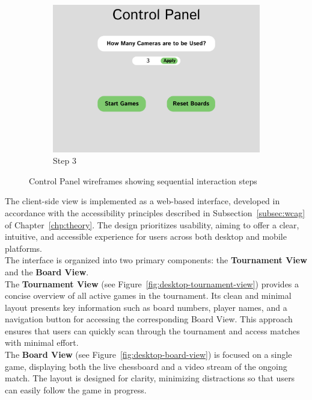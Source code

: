 \begin{figure}[h!]
    \begin{subfigure}[h!]{0.40\linewidth}
        \centering
        \includegraphics[width=\linewidth]{figures/methods/wireframes/control-panel-3.png}
        \caption{Step 3}
        \label{fig:control-panel-3}
    \end{subfigure}
    
    \caption{Control Panel wireframes showing sequential interaction steps}
    \label{fig:control-panel-group}
\end{figure}


The client-side view is implemented as a web-based interface, developed in accordance with the accessibility principles described in Subsection~\ref{subsec:wcag} of Chapter~\ref{chp:theory}. The design prioritizes usability, aiming to offer a clear, intuitive, and accessible experience for users across both desktop and mobile platforms. \\

The interface is organized into two primary components: the \textbf{Tournament View} and the \textbf{Board View}. \\

The \textbf{Tournament View} (see Figure~\ref{fig:desktop-tournament-view}) provides a concise overview of all active games in the tournament. Its clean and minimal layout presents key information such as board numbers, player names, and a navigation button for accessing the corresponding Board View. This approach ensures that users can quickly scan through the tournament and access matches with minimal effort. \\

The \textbf{Board View} (see Figure~\ref{fig:desktop-board-view}) is focused on a single game, displaying both the live chessboard and a video stream of the ongoing match. The layout is designed for clarity, minimizing distractions so that users can easily follow the game in progress. \\

